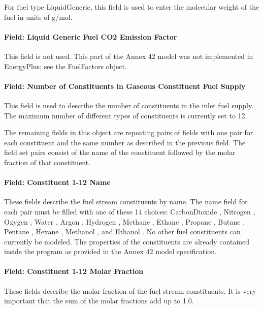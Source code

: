 For fuel type LiquidGeneric, this field is used to enter the molecular weight of the fuel in units of g/mol.

\paragraph{Field: Liquid Generic Fuel CO2 Emission Factor}\label{field-liquid-generic-fuel-co2-emission-factor}

This field is not used. This part of the Annex 42 model was not implemented in EnergyPlus; see the FuelFactors object.

\paragraph{Field: Number of Constituents in Gaseous Constituent Fuel Supply}\label{field-number-of-constituents-in-gaseous-constituent-fuel-supply}

This field is used to describe the number of constituents in the inlet fuel supply. The maximum number of different types of constituents is currently set to 12.

The remaining fields in this object are repeating pairs of fields with one pair for each constituent and the same number as described in the previous field. The field set pairs consist of the name of the constituent followed by the molar fraction of that constituent.

\paragraph{Field: Constituent 1-12 Name}\label{field-constituent-1-12-name}

These fields describe the fuel stream constituents by name. The name field for each pair must be filled with one of these 14 choices: CarbonDioxide , Nitrogen , Oxygen , Water , Argon , Hydrogen , Methane , Ethane , Propane , Butane , Pentane , Hexane , Methanol , and Ethanol . No other fuel constituents can currently be modeled. The properties of the constituents are already contained inside the program as provided in the Annex 42 model specification.

\paragraph{Field: Constituent 1-12 Molar Fraction}\label{field-constituent-1-12-molar-fraction}

These fields describe the molar fraction of the fuel stream constituents. It is very important that the sum of the molar fractions add up to 1.0.

